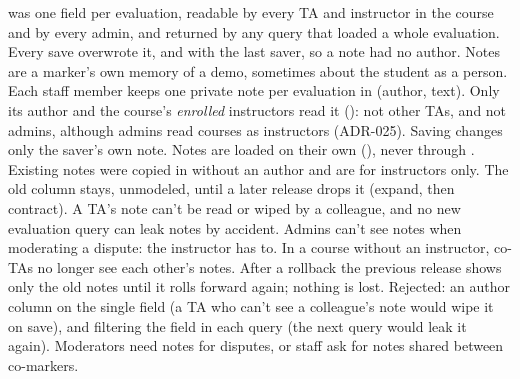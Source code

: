   { was one field per evaluation, readable by every TA and
   instructor in the course and by every admin, and returned by any query that loaded a whole
   evaluation. Every save overwrote it, and  with the last saver, so a note had
   no author. Notes are a marker's own memory of a demo, sometimes about the student as a person.}
  {Each staff member keeps one private note per evaluation in  (author,
   text). Only its author and the course's \emph{enrolled} instructors read it
   (): not other TAs, and not admins, although admins read courses as
   instructors (ADR-025). Saving changes only the saver's own note. Notes are loaded on their own
   (), never through . Existing notes were copied in without
   an author and are for instructors only. The old column stays, unmodeled, until a later release
   drops it (expand, then contract).}
  {A TA's note can't be read or wiped by a colleague, and no new evaluation query can leak notes
   by accident. Admins can't see notes when moderating a dispute: the instructor has to. In a course
   without an instructor, co-TAs no longer see each other's notes. After a rollback the previous
   release shows only the old notes until it rolls forward again; nothing is lost. Rejected: an
   author column on the single field (a TA who can't see a colleague's note would wipe it on save),
   and filtering the field in each query (the next query would leak it again).}
  {Moderators need notes for disputes, or staff ask for notes shared between co-markers.}

